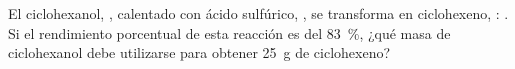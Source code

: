 El ciclohexanol, , calentado con ácido sulfúrico, , se transforma en ciclohexeno, : . Si el rendimiento porcentual de esta reacción es del \SI{83}{\percent}, ¿qué masa de ciclohexanol debe utilizarse para obtener \SI{25}{\gram} de ciclohexeno?
